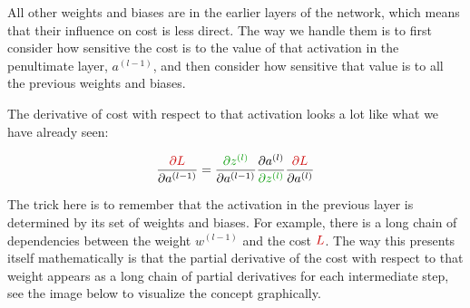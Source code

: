 All other weights and biases are in the earlier layers of the network, which means that their influence on cost is less direct. The way we handle them is to first consider how sensitive the cost is to the value of that activation in the penultimate layer, \( a^{(l-1)} \), and then consider how sensitive that value is to all the previous weights and biases.

The derivative of cost with respect to that activation looks a lot like what we have already seen:

\vspace{-0.5cm}
$$\frac{\textcolor{myred}{\partial L}}{\partial a^{(l-1)}} = \frac{\textcolor{mygreen}{\partial z^{(l)}}}{\partial a^{(l-1)}}  \frac{\partial a^{(l)}}{\textcolor{mygreen}{\partial z^{(l)}}} \frac{\textcolor{myred}{\partial L}}{\partial a^{(l)}}$$

The trick here is to remember that the activation in the previous layer is determined by its set of weights and biases. For example, there is a long chain of dependencies between the weight \( w^{(l-1)} \) and the cost \( \textcolor{myred}{L} \). The way this presents itself mathematically is that the partial derivative of the cost with respect to that weight appears as a long chain of partial derivatives for each intermediate step, see the image below to visualize the concept graphically.

